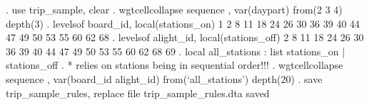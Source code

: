 . use trip_sample, clear
{\smallskip}
. wgtcellcollapse sequence , var(daypart) from(2 3 4) depth(3)
{\smallskip}
. levelsof board_id, local(stations_on)
1 2 8 11 18 24 26 30 36 39 40 44 47 49 50 53 55 60 62 68
{\smallskip}
. levelsof alight_id, local(stations_off)
2 8 11 18 24 26 30 36 39 40 44 47 49 50 53 55 60 62 68 69
{\smallskip}
. local all_stations : list stations_on | stations_off
{\smallskip}
. * relies on stations being in sequential order!!!
. wgtcellcollapse sequence , var(board_id alight_id) from(`all_stations') depth(20)
{\smallskip}
. save trip_sample_rules, replace
file trip_sample_rules.dta saved
